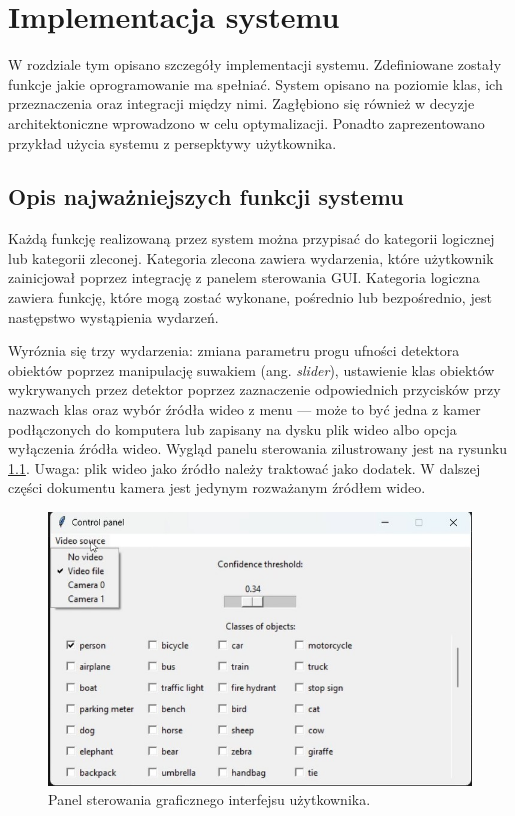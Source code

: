 \chapter{Implementacja systemu}
\label{sec:implementacja-systemu}
W rozdziale tym opisano szczegóły implementacji systemu. 
Zdefiniowane zostały funkcje jakie oprogramowanie ma spełniać.  
System opisano na poziomie klas, ich przeznaczenia oraz integracji między nimi. Zagłębiono się również w  decyzje architektoniczne wprowadzono w celu optymalizacji. 
Ponadto zaprezentowano przykład użycia systemu z persepktywy użytkownika.

\section{Opis najważniejszych funkcji systemu}
Każdą funkcję realizowaną przez system można przypisać do kategorii logicznej lub kategorii zleconej. Kategoria zlecona zawiera wydarzenia, które użytkownik zainicjował poprzez integrację z panelem sterowania GUI. Kategoria logiczna zawiera funkcję, które mogą zostać wykonane, pośrednio lub bezpośrednio, jest następstwo wystąpienia wydarzeń.

Wyróznia się trzy wydarzenia: zmiana parametru progu ufności detektora obiektów poprzez manipulację suwakiem (ang. \emph{slider}), ustawienie klas obiektów wykrywanych przez detektor poprzez zaznaczenie odpowiednich przycisków przy nazwach klas oraz wybór źródła wideo z menu --- może to być jedna z kamer podłączonych do komputera lub zapisany na dysku plik wideo albo opcja wyłączenia źródła wideo. Wygląd panelu sterowania zilustrowany jest na rysunku \ref{fig:panel-sterowania}. 
Uwaga: plik wideo jako źródło należy traktować jako dodatek. W dalszej części dokumentu kamera jest jedynym rozważanym źródłem wideo.   

\begin{figure}[H]
    \centering
    \includegraphics[width=0.79\linewidth]{r_implementacja/panel_sterowania/panel.jpg}
    \caption{Panel sterowania graficznego interfejsu użytkownika.}
    \label{fig:panel-sterowania}
\end{figure}

